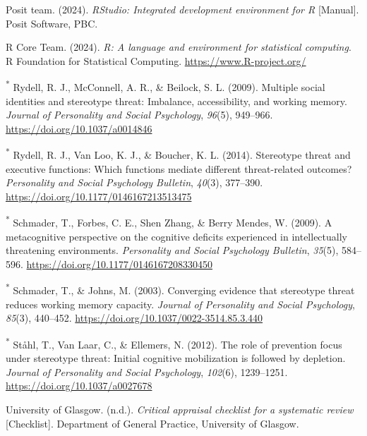 \documentclass[
  stu,floatsintext]{apa7}
\newlength{\cslhangindent}
\newenvironment{CSLReferences}[2] %
 {\begin{list}{}{%
  \setlength{\itemindent}{0pt}
  \setlength{\leftmargin}{0pt}
  \setlength{\parsep}{0pt}
  \ifodd #1
   \setlength{\leftmargin}{\cslhangindent}
   \setlength{\itemindent}{-1\cslhangindent}
  \fi
  \setlength{\itemsep}{#2\baselineskip}}}
 {\end{list}}
\begin{document}
\begin{CSLReferences}{1}{0}
Posit team. (2024). \emph{{RStudio}: {Integrated} development environment for {R}} {[}Manual{]}. Posit Software, PBC.

R Core Team. (2024). \emph{R: A language and environment for statistical computing}. R Foundation for Statistical Computing. \url{https://www.R-project.org/}

\textsuperscript{*} Rydell, R. J., McConnell, A. R., \& Beilock, S. L. (2009). Multiple social identities and stereotype threat: {Imbalance}, accessibility, and working memory. \emph{Journal of Personality and Social Psychology}, \emph{96}(5), 949--966. \url{https://doi.org/10.1037/a0014846}

\textsuperscript{*} Rydell, R. J., Van Loo, K. J., \& Boucher, K. L. (2014). Stereotype threat and executive functions: {Which} functions mediate different threat-related outcomes? \emph{Personality and Social Psychology Bulletin}, \emph{40}(3), 377--390. \url{https://doi.org/10.1177/0146167213513475}

\textsuperscript{*} Schmader, T., Forbes, C. E., Shen Zhang, \& Berry Mendes, W. (2009). A metacognitive perspective on the cognitive deficits experienced in intellectually threatening environments. \emph{Personality and Social Psychology Bulletin}, \emph{35}(5), 584--596. \url{https://doi.org/10.1177/0146167208330450}

\textsuperscript{*} Schmader, T., \& Johns, M. (2003). Converging evidence that stereotype threat reduces working memory capacity. \emph{Journal of Personality and Social Psychology}, \emph{85}(3), 440--452. \url{https://doi.org/10.1037/0022-3514.85.3.440}

\textsuperscript{*} Ståhl, T., Van Laar, C., \& Ellemers, N. (2012). The role of prevention focus under stereotype threat: {Initial} cognitive mobilization is followed by depletion. \emph{Journal of Personality and Social Psychology}, \emph{102}(6), 1239--1251. \url{https://doi.org/10.1037/a0027678}

University of Glasgow. (n.d.). \emph{Critical appraisal checklist for a systematic review} {[}Checklist{]}. Department of General Practice, University of Glasgow.


\end{CSLReferences}
\end{document}
